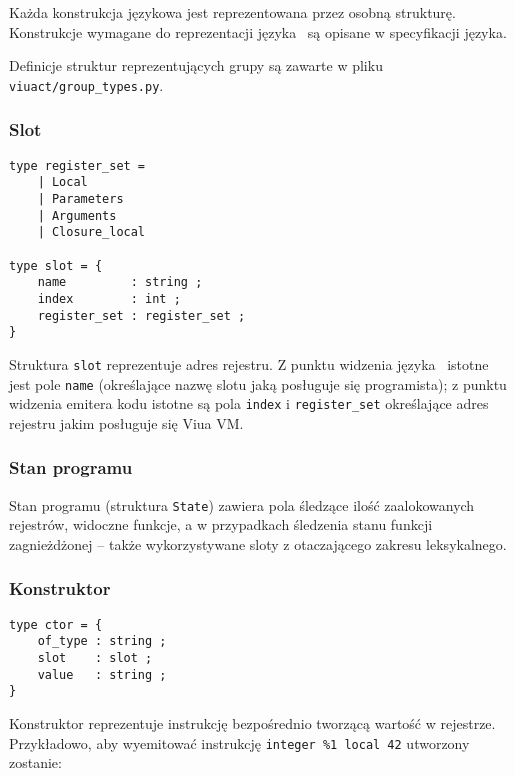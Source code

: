 Każda konstrukcja językowa jest reprezentowana przez osobną strukturę. Konstrukcje wymagane do reprezentacji
języka \ViuAct\ są opisane w specyfikacji języka.

Definicje struktur reprezentujących grupy są zawarte w pliku \texttt{viuact/group\_types.py}.

\subsubsection{Slot}
\label{diagram_klas_slot}

\begin{small}
\begin{lstlisting}
type register_set =
    | Local
    | Parameters
    | Arguments
    | Closure_local

type slot = {
    name         : string ;
    index        : int ;
    register_set : register_set ;
}
\end{lstlisting}
\end{small}

Struktura \texttt{slot} reprezentuje adres rejestru. Z punktu widzenia języka \ViuAct\ istotne jest pole
\texttt{name} (określające nazwę slotu jaką posługuje się programista); z punktu widzenia emitera kodu istotne
są pola \texttt{index} i \texttt{register\_set} określające adres rejestru jakim posługuje się Viua VM.

\subsubsection{Stan programu}
\label{diagram_klas_stan_programu}

Stan programu (struktura \texttt{State}) zawiera pola śledzące ilość zaalokowanych rejestrów, widoczne
funkcje, a w przypadkach śledzenia stanu funkcji zagnieżdżonej -- także wykorzystywane sloty z otaczającego
zakresu leksykalnego.

\subsubsection{Konstruktor}
\label{diagram_klas_konstruktor}

\begin{small}
\begin{lstlisting}
type ctor = {
    of_type : string ;
    slot    : slot ;
    value   : string ;
}
\end{lstlisting}
\end{small}

Konstruktor reprezentuje instrukcję bezpośrednio tworzącą wartość w rejestrze. Przykładowo, aby wyemitować
instrukcję \texttt{integer \%1 local 42} utworzony zostanie:


